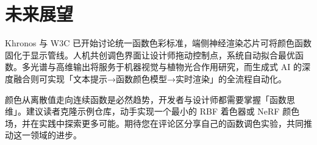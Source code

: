 \chapter{未来展望}
Khronos 与 W3C 已开始讨论统一函数色彩标准，端侧神经渲染芯片可将颜色函数固化于显示管线。人机共创调色界面让设计师拖动控制点，系统自动拟合最优函数。多光谱与高维输出将服务于机器视觉与植物光合作用研究，而生成式 AI 的深度融合则可实现「文本提示→函数颜色模型→实时渲染」的全流程自动化。\par
颜色从离散值走向连续函数是必然趋势，开发者与设计师都需要掌握「函数思维」。建议读者克隆示例仓库，动手实现一个最小的 RBF 着色器或 NeRF 颜色场，并在实践中探索更多可能。期待您在评论区分享自己的函数调色实验，共同推动这一领域的进步。\par
